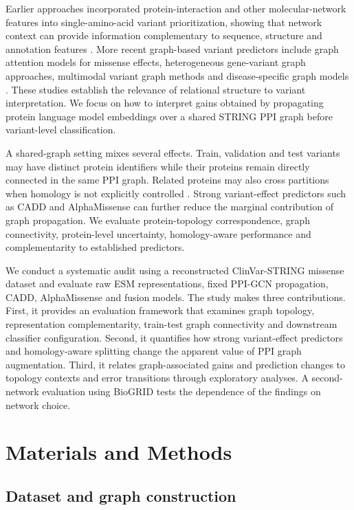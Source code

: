 \documentclass[conference]{IEEEtran}
\begin{document}
Earlier approaches incorporated protein-interaction and other molecular-network features into single-amino-acid variant prioritization, showing that network context can provide information complementary to sequence, structure and annotation features \cite{Yates2014SuSPect,Ozturk2022NetworkFeatures}. More recent graph-based variant predictors include graph attention models for missense effects, heterogeneous gene-variant graph approaches, multimodal variant graph methods and disease-specific graph models \cite{Zhang2022gMVP,Cheng2021VEGN,Yu2025GNNMAP,Ghadie2025DiseaseSpecificGNN}. These studies establish the relevance of relational structure to variant interpretation. We focus on how to interpret gains obtained by propagating protein language model embeddings over a shared STRING PPI graph before variant-level classification.

A shared-graph setting mixes several effects. Train, validation and test variants may have distinct protein identifiers while their proteins remain directly connected in the same PPI graph. Related proteins may also cross partitions when homology is not explicitly controlled \cite{Littmann2022ProteinMLTips,Teufel2023GraphPart}. Strong variant-effect predictors such as CADD and AlphaMissense can further reduce the marginal contribution of graph propagation. We evaluate protein-topology correspondence, graph connectivity, protein-level uncertainty, homology-aware performance and complementarity to established predictors.

We conduct a systematic audit using a reconstructed ClinVar-STRING missense dataset and evaluate raw ESM representations, fixed PPI-GCN propagation, CADD, AlphaMissense and fusion models. The study makes three contributions. First, it provides an evaluation framework that examines graph topology, representation complementarity, train-test graph connectivity and downstream classifier configuration. Second, it quantifies how strong variant-effect predictors and homology-aware splitting change the apparent value of PPI graph augmentation. Third, it relates graph-associated gains and prediction changes to topology contexts and error transitions through exploratory analyses. A second-network evaluation using BioGRID tests the dependence of the findings on network choice.

\section{Materials and Methods}

\subsection{Dataset and graph construction}
\end{document}
